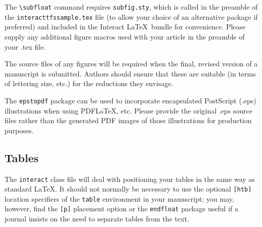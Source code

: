 \documentclass[]{interact}
\theoremstyle{plain}%
\theoremstyle{definition}
\theoremstyle{remark}
\begin{document}
The \verb"\subfloat" command requires \verb"subfig.sty", which is called in the preamble of the \texttt{interacttfssample.tex} file (to allow your choice of an alternative package if preferred) and included in the \textsf{Interact} \LaTeX\ bundle for convenience. Please supply any additional figure macros used with your article in the preamble of your .tex file.

The source files of any figures will be required when the final, revised version of a manuscript is submitted. Authors should ensure that these are suitable (in terms of lettering size, etc.) for the reductions they envisage.

The \texttt{epstopdf} package can be used to incorporate encapsulated PostScript (.eps) illustrations when using PDF\LaTeX, etc. Please provide the original .eps source files rather than the generated PDF images of those illustrations for production purposes.


\subsection{Tables}

The \texttt{interact} class file will deal with positioning your tables in the same way as standard \LaTeX. It should not normally be necessary to use the optional \texttt{[htb]} location specifiers of the \texttt{table} environment in your manuscript; you may, however, find the \verb"[p]" placement option or the \verb"endfloat" package useful if a journal insists on the need to separate tables from the text.
\end{document}
